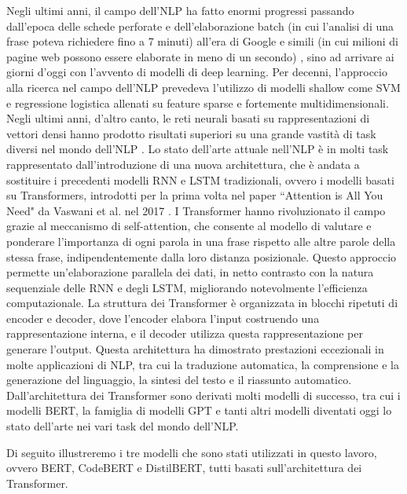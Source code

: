\documentclass[../../Thesis.tex]{subfiles}
\begin{document}
Negli ultimi  anni, il campo dell'NLP ha fatto enormi progressi passando dall'epoca delle schede perforate e dell'elaborazione batch (in cui l'analisi di una frase poteva richiedere fino a 7 minuti) all'era di Google e simili (in cui milioni di pagine web possono essere elaborate in meno di un secondo) \cite{6786458}, sino ad arrivare ai giorni d'oggi con l'avvento di modelli di deep learning. Per decenni, l'approccio alla ricerca nel campo dell'NLP prevedeva l'utilizzo di modelli shallow come SVM \cite{SVM} e regressione logistica \cite{logisticReg} allenati su feature sparse e fortemente multidimensionali. Negli ultimi anni, d'altro canto,  le reti neurali basati su rappresentazioni di vettori densi hanno prodotto risultati superiori su una grande vastit\`a di task diversi nel mondo dell'NLP \cite{TrendsInNLP}. 
Lo stato dell'arte attuale nell'NLP \`e in molti task rappresentato dall'introduzione di una nuova architettura, che \`e andata a sostituire i precedenti modelli  RNN e LSTM \cite{LSTM} tradizionali, ovvero i modelli basati su Transformers, introdotti per la prima volta nel paper ``Attention is All You Need" da Vaswani et al. nel 2017 \cite{AttentionIsAllYouNeed}. I Transformer hanno rivoluzionato il campo grazie al meccanismo di self-attention, che consente al modello di valutare e ponderare l'importanza di ogni parola in una frase rispetto alle altre parole della stessa frase, indipendentemente dalla loro distanza posizionale. Questo approccio permette un'elaborazione parallela dei dati, in netto contrasto con la natura sequenziale delle RNN e degli LSTM, migliorando notevolmente l'efficienza computazionale. La struttura dei Transformer \`e organizzata in blocchi ripetuti di encoder e decoder, dove l'encoder elabora l'input costruendo una rappresentazione interna, e il decoder utilizza questa rappresentazione per generare l'output. Questa architettura ha dimostrato prestazioni eccezionali in molte applicazioni di NLP, tra cui la traduzione automatica, la comprensione e la generazione del linguaggio, la sintesi del testo e il riassunto automatico. Dall'architettura dei Transformer sono derivati molti modelli di successo, tra cui i modelli BERT, la famiglia di modelli GPT e tanti altri modelli diventati oggi lo stato dell'arte nei vari task del mondo dell'NLP. 

Di seguito illustreremo i tre modelli che sono stati utilizzati in questo lavoro, ovvero BERT, CodeBERT e DistilBERT, tutti basati sull'architettura dei Transformer.
\end{document}

